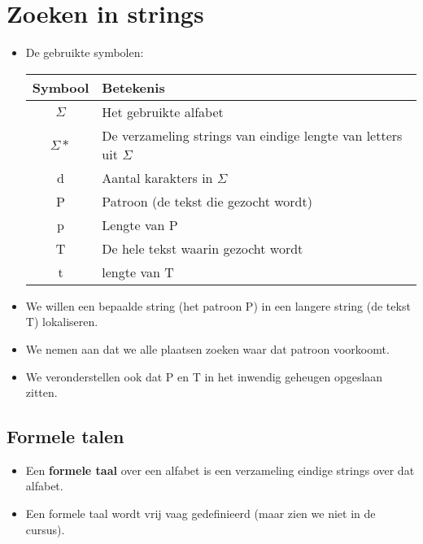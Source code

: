 \newcommand{\nonterminal}[1]{
    \langle \textbf{#1} \rangle
}

\chapter{Zoeken in strings}
\label{ch:zoeken_in_strings}
\begin{itemize}
    \item De gebruikte symbolen:

    \begin{table}[ht]
        \centering
        \begin{tabular}{c l}
            \hline
            Symbool & Betekenis \\
            \hline
            $\Sigma$ & Het gebruikte alfabet \\
            $\Sigma*$ & De verzameling strings van eindige lengte van letters uit $\Sigma$ \\
            d & Aantal karakters in $\Sigma$ \\
            P & Patroon (de tekst die gezocht wordt) \\
            p & Lengte van P \\
            T & De hele tekst waarin gezocht wordt\\
            t & lengte van T \\
            \hline
        \end{tabular}
    \end{table}

    \item We willen een bepaalde string (het patroon P) in een langere string (de tekst T) lokaliseren.
    \item We nemen aan dat we alle plaatsen zoeken waar dat patroon voorkoomt.
    \item We veronderstellen ook dat P en T in het inwendig geheugen opgeslaan zitten.
\end{itemize}


\section{Formele talen}
\begin{itemize}
    \item Een \textbf{formele taal} over een alfabet is een verzameling eindige strings over dat alfabet.
    \item Een formele taal wordt vrij vaag gedefinieerd (maar zien we niet in de cursus).
\end{itemize}


